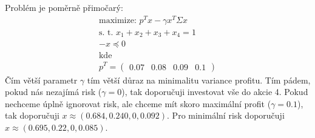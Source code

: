 \documentclass[12pt, a4paper]{article}
\begin{document}
\section{}
Problém je poměrně přimočarý:
\begin{gather*}
\text{maximize: } p^Tx - \gamma x^T \Sigma x\\
\text{s. t. } x_1+x_2+x_3+x_4 = 1\\
-x \preceq 0\\
\text{kde}\\
p^T = \begin{pmatrix}
0.07 & 0.08 & 0.09 & 0.1
\end{pmatrix}
\end{gather*}
Čím větší parametr $\gamma$ tím větší důraz na minimalitu variance profitu. Tím pádem, pokud nás nezajímá risk ($\gamma = 0$), tak doporučuji investovat vše do akcie 4. Pokud nechceme úplně ignorovat risk, ale chceme mít skoro maximální profit ($\gamma = 0.1$), tak doporučuji $x  \approx (0.684, 0.240, 0, 0.092)$. Pro minimální risk doporučuji $x \approx (0.695,0.22, 0, 0.085)$.
\end{document}

